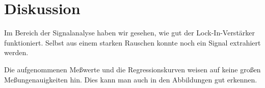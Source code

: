 
\section{Diskussion}

Im Bereich der Signalanalyse haben wir gesehen, wie gut der
Lock-In-Verstärker funktioniert. Selbst aus einem starken Rauschen
konnte noch ein Signal extrahiert werden.

Die aufgenommenen Meßwerte und die Regressionskurven weisen auf keine
großen Meßungenauigkeiten hin. Dies kann man auch in den Abbildungen gut
erkennen. 
